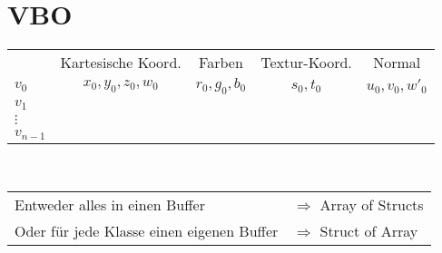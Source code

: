 \chapter{VBO}
\begin{tabular}{lcccc}
			& Kartesische Koord. 	& Farben 		& Textur-Koord. & Normal			\\
	$v_0$	& $x_0, y_0,z_0,w_0 $	& $r_0,g_0,b_0$	& $s_0,t_0$		& $u_0, v_0, w'_0$	\\
	$v_1$	&						&				&				&					\\
	$\vdots$&						&				&				&					\\
	$v_{n-1}$&						&				&				&					
\end{tabular}\\
\begin{tabular}{ll}
	Entweder alles in einen Buffer &$\Rightarrow$ Array of Structs\\
	Oder für jede Klasse einen eigenen Buffer &$\Rightarrow$ Struct of Array %
\end{tabular}
\begin{tikzpicture}
\end{tikzpicture}

